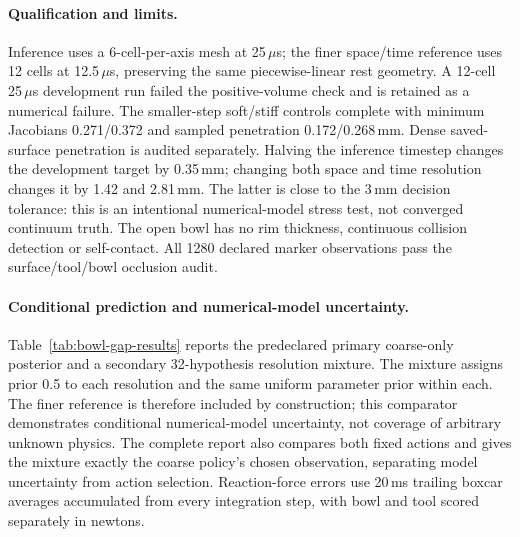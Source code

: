 \paragraph{Qualification and limits.}
Inference uses a 6-cell-per-axis mesh at 25\,$\mu$s; the finer space/time reference
uses 12 cells at 12.5\,$\mu$s, preserving the same piecewise-linear rest geometry.
A 12-cell 25\,$\mu$s development run failed the positive-volume check and is retained
as a numerical failure. The smaller-step soft/stiff controls complete with minimum
Jacobians 0.271/0.372 and sampled penetration 0.172/0.268\,mm. Dense saved-surface
penetration is audited separately. Halving the inference timestep changes the
development target by 0.35\,mm; changing both space and time resolution changes it
by 1.42 and 2.81\,mm. The latter is close to the 3\,mm decision tolerance: this is an
intentional numerical-model stress test, not converged continuum truth.
The open bowl has no rim thickness, continuous collision detection or self-contact.
All 1280 declared marker observations pass the surface/tool/bowl occlusion audit.

\paragraph{Conditional prediction and numerical-model uncertainty.}
Table~\ref{tab:bowl-gap-results} reports the predeclared primary coarse-only posterior
and a secondary 32-hypothesis resolution mixture. The mixture assigns prior 0.5 to
each resolution and the same uniform parameter prior within each. The finer
reference is therefore included by construction; this comparator demonstrates
conditional numerical-model uncertainty, not coverage of arbitrary unknown physics.
The complete report also compares both fixed actions and gives the mixture exactly
the coarse policy's chosen observation, separating model uncertainty from action
selection. Reaction-force errors use 20\,ms trailing boxcar averages accumulated
from every integration step, with bowl and tool scored separately in newtons.

